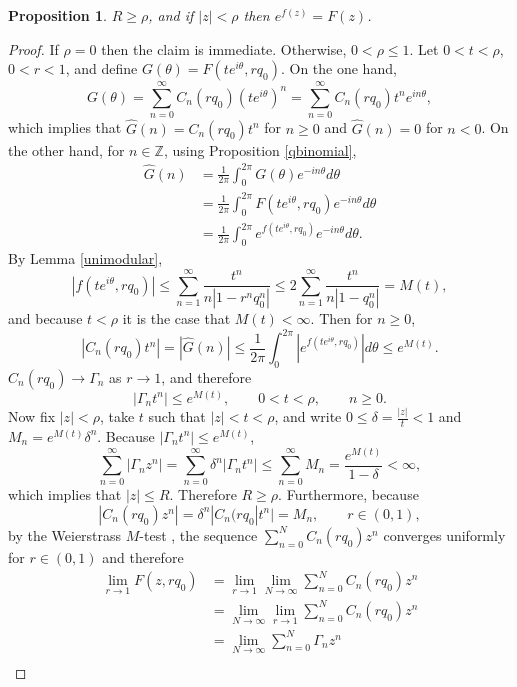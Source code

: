 \documentclass{amsart}
\newtheorem{proposition}[theorem]{Proposition}
\begin{document}
\begin{proposition}
$R \geq \rho$, and if $|z| < \rho$ then $e^{f(z)} = F(z)$. 
\label{Rgeqrho}
\end{proposition}
\begin{proof}
If $\rho=0$ then the claim is immediate. Otherwise, $0 < \rho \leq 1$. Let
 $0<t<\rho$, $0<r<1$, and  define $G(\theta) = F(te^{i\theta},rq_0)$.
On the one hand,
\[
G(\theta) = \sum_{n=0}^\infty C_n(rq_0) (te^{i\theta})^n = \sum_{n=0}^\infty C_n(rq_0) t^n e^{in\theta},
\]
which implies that $\widehat{G}(n)=C_n(rq_0) t^n$ for $n \geq 0$ and $\widehat{G}(n)=0$ for $n<0$. 
On the other hand,
for $n \in \mathbb{Z}$, using 
Proposition \ref{qbinomial},
\begin{align*}
\widehat{G}(n) &= \frac{1}{2\pi} \int_0^{2\pi} G(\theta) e^{-in\theta} d\theta\\
&=\frac{1}{2\pi} \int_0^{2\pi} F(te^{i\theta},rq_0) e^{-in\theta} d\theta\\
&=\frac{1}{2\pi} \int_0^{2\pi} e^{f(te^{i\theta},rq_0)} e^{-in\theta} d\theta.
\end{align*}
By Lemma \ref{unimodular},
\[
|f(te^{i\theta},rq_0)| \leq \sum_{n=1}^\infty \frac{t^n}{n|1-r^n q_0^n|}
\leq 2 \sum_{n=1}^\infty \frac{t^n}{n|1-q_0^n|} = M(t),
\]
and because
$t<\rho$ it is the case that $M(t)<\infty$. 
Then for $n \geq 0$,
\[
|C_n(rq_0) t^n| = |\widehat{G}(n)| \leq  \frac{1}{2\pi} \int_0^{2\pi} |e^{f(te^{i\theta},rq_0)}| d\theta
\leq e^{M(t)}.
\]
$C_n(rq_0) \to \Gamma_n$ as $r \to 1$, and therefore
\[
|\Gamma_n t^n| \leq e^{M(t)},\qquad 0<t<\rho,\qquad n \geq 0.
\]
Now fix $|z|<\rho$, take $t$ such that $|z|<t<\rho$, and write $0 \leq \delta=\frac{|z|}{t}<1$
and $M_n=e^{M(t)} \delta^n$.
Because $|\Gamma_n t^n| \leq e^{M(t)}$,
\[
\sum_{n=0}^\infty |\Gamma_n z^n| = \sum_{n=0}^\infty  \delta^n |\Gamma_n t^n| \leq \sum_{n=0}^\infty  M_n
=\frac{e^{M(t)}}{1-\delta}<\infty,
\]
which implies that $|z| \leq R$. Therefore $R \geq \rho$.
Furthermore, because
\[
|C_n(rq_0) z^n| = \delta^n |C_n(rq_0| t^n| = M_n,\qquad r \in (0,1),
\]
by the Weierstrass $M$-test \cite[p.~148, Theorem 7.10]{rudin}, the sequence $\sum_{n=0}^N C_n(rq_0) z^n$ converges uniformly for $r \in (0,1)$ and therefore \cite[p.~149, Theorem 7.11]{rudin}
\begin{align*}
\lim_{r \to 1} F(z,rq_0)&=\lim_{r \to 1} \lim_{N \to \infty} \sum_{n=0}^N C_n(rq_0)z^n\\
&=\lim_{N \to \infty} \lim_{r \to 1}  \sum_{n=0}^N C_n(rq_0)z^n\\
&=\lim_{N \to \infty} \sum_{n=0}^N \Gamma_n z^n\\

\end{align*}
\end{proof}
\end{document}
